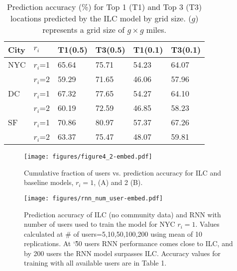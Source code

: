 \begin{table}[]
\centering
\caption{Prediction accuracy (\%) for Top 1 (T1) and Top 3 (T3) locations predicted by the ILC model by grid size. ($g$) represents a grid size of $g \times g$ miles.}
\begin{tabular}{llllll}
\toprule
City & $r_i$   & T1(0.5) & T3(0.5) & T1(0.1) & T3(0.1) \\
\midrule
NYC  & $r_i$=1 & 65.64       & 75.71       & 54.23       & 64.07       \\
     & $r_i$=2 & 59.29       & 71.65       & 46.06       & 57.96       \\
DC   & $r_i$=1 & 67.32       & 77.65       & 54.27       & 64.10       \\
     & $r_i$=2 & 60.19       & 72.59       & 46.85       & 58.23       \\
SF   & $r_i$=1 & 70.86       & 80.97       & 57.37       & 67.26       \\
     & $r_i$=2 & 63.37       & 75.47       & 48.07       & 59.81      \\
\bottomrule
\end{tabular}

\end{table}



\begin{figure}[t]
\centering
\texttt{[image: figures/figure4\_2-embed.pdf]}
\caption{Cumulative fraction of users vs. prediction accuracy for ILC and baseline models, $r_i=1$, (A) and 2 (B).}
\label{cdf_accuracy}
\end{figure}

\begin{figure}[t]
\centering
\texttt{[image: figures/rnn\_num\_user-embed.pdf]}
\caption{Prediction accuracy of ILC (no community data) and RNN with number of users used to train the model for NYC $r_i=1$. Values calculated at \# of users=5,10,50,100,200 using mean of 10 replications. At \char`\~50 users RNN performance comes close to ILC, and by 200 users the RNN model surpasses ILC. Accuracy values for training with all available users are in Table 1.}
\label{rnn_num_user}
\end{figure}






